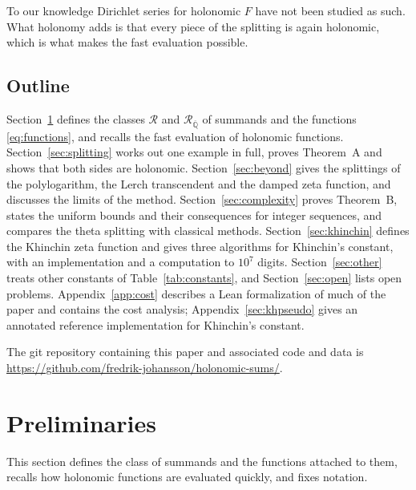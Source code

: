 \documentclass[11pt,reqno]{amsart}
\theoremstyle{definition}
\theoremstyle{remark}
\newcommand{\Qbar}{\overline{\mathbb{Q}}}
\newcommand{\Reg}{\mathcal{R}}
\newcommand{\RegQ}{\mathcal{R}_{\Qbar}}
\begin{document}
To our knowledge Dirichlet series for holonomic $F$ have not been studied as such. What holonomy adds is that every piece of the splitting is again holonomic, which is
what makes the fast evaluation possible.

\subsection{Outline}
Section~\ref{sec:defs} defines the classes $\Reg$ and $\RegQ$ of summands and the functions
\eqref{eq:functions}, and recalls the fast evaluation of holonomic functions. Section~\ref{sec:splitting} works out one
example in full, proves Theorem~A and shows that both sides are holonomic. Section~\ref{sec:beyond} gives the splittings of the polylogarithm, the Lerch transcendent and the damped zeta
function, and discusses the limits of the method. Section~\ref{sec:complexity} proves Theorem~B, states the
uniform bounds and their consequences for integer sequences, and compares the theta splitting with classical
methods. Section~\ref{sec:khinchin} defines the Khinchin zeta function and gives three algorithms for Khinchin's
constant, with an implementation and a computation to $10^7$ digits. Section~\ref{sec:other} treats other
constants of Table~\ref{tab:constants}, and Section~\ref{sec:open} lists open problems. Appendix~\ref{app:cost} describes a
Lean formalization of much of the paper and contains the cost analysis;
Appendix~\ref{sec:khpseudo} gives an annotated reference implementation for Khinchin's constant.

The git repository containing this paper and associated code
and data is \url{https://github.com/fredrik-johansson/holonomic-sums/}.

\section{Preliminaries}\label{sec:defs}
This section defines the class of summands and the functions attached to them, recalls how holonomic functions are
evaluated quickly, and fixes notation.
\end{document}
